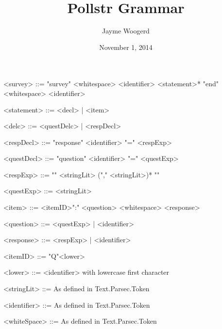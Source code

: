 \documentclass{article}
\title{Pollstr Grammar}
\author{Jayme Woogerd}
\date{November 1, 2014}
\begin{document}
\maketitle
\thispagestyle{empty}

\begin{grammar}

    <survey>     ::= "survey"  <whitespace> <identifier> <statement>* "end" <whitespace> <identifier>

    <statement>  ::= <decl> | <item>

    <delc>       ::= <questDelc> | <respDecl>

    <respDecl>   ::= "response" <identifier> "=" <respExp>

    <questDecl>  ::= "question" <identifier> "=" <questExp>

    <respExp>    ::= "{" <stringLit> ("," <stringLit>)* "}"

    <questExp>   ::= <stringLit>

    <item>       ::= <itemID>":" <question> <whitespace> <response>

    <question>   ::= <questExp> | <identifier>

    <response>   ::= <respExp> | <identifier>

    <itemID>     ::= "Q"<lower>

    <lower>      ::= <identifier> with lowercase first character

    <stringLit>  ::= As defined in Text.Parsec.Token

    <identifier> ::= As defined in Text.Parsec.Token

    <whiteSpace> ::= As defined in Text.Parsec.Token


\end{grammar}
\end{document}
